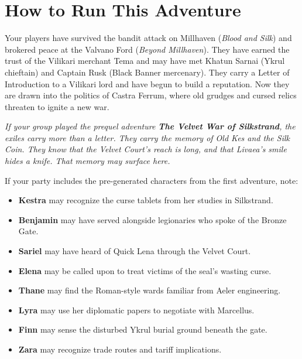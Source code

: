 \documentclass[10pt,twoside]{book}
\begin{document}


\thispagestyle{empty}

\tableofcontents
\thispagestyle{empty}
\cleardoublepage


\chapter{How to Run This Adventure}
\setcounter{page}{1}

\begin{recapbox}
Your players have survived the bandit attack on Millhaven (\textit{Blood and Silk}) and brokered peace at the Valvano Ford (\textit{Beyond Millhaven}). They have earned the trust of the Vilikari merchant Tema and may have met Khatun Sarnai (Ykrul chieftain) and Captain Rusk (Black Banner mercenary). They carry a Letter of Introduction to a Vilikari lord and have begun to build a reputation. Now they are drawn into the politics of Castra Ferrum, where old grudges and cursed relics threaten to ignite a new war.

\vspace{0.5em}
\noindent \textit{If your group played the prequel adventure \textbf{The Velvet War of Silkstrand}, the exiles carry more than a letter. They carry the memory of Old Kes and the Silk Coin. They know that the Velvet Court's reach is long, and that Livaea's smile hides a knife. That memory may surface here.}

If your party includes the pre-generated characters from the first adventure, note:
\begin{itemize}
\item \textbf{Kestra} may recognize the curse tablets from her studies in Silkstrand.
\item \textbf{Benjamin} may have served alongside legionaries who spoke of the Bronze Gate.
\item \textbf{Sariel} may have heard of Quick Lena through the Velvet Court.
\item \textbf{Elena} may be called upon to treat victims of the seal's wasting curse.
\item \textbf{Thane} may find the Roman-style wards familiar from Aeler engineering.
\item \textbf{Lyra} may use her diplomatic papers to negotiate with Marcellus.
\item \textbf{Finn} may sense the disturbed Ykrul burial ground beneath the gate.
\item \textbf{Zara} may recognize trade routes and tariff implications.
\end{itemize}
\end{recapbox}
\end{document}
